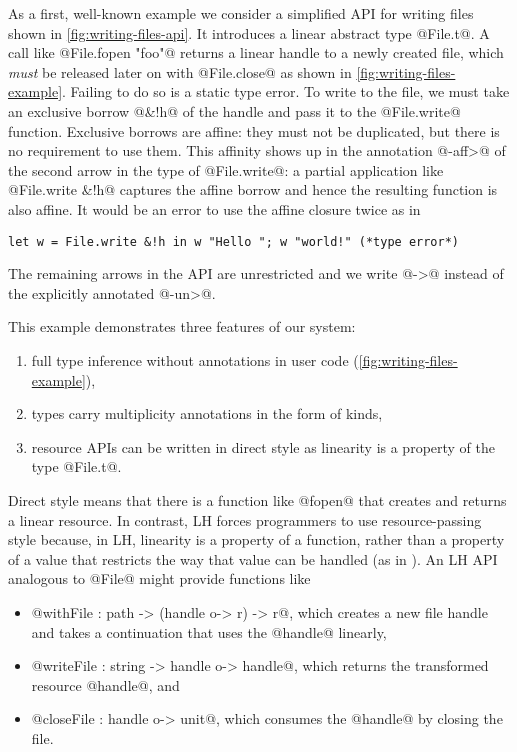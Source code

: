 As a first, well-known example we consider a simplified API for
writing files shown in \cref{fig:writing-files-api}.  It introduces a
linear abstract type @File.t@. A call like
@File.fopen "foo"@ returns a linear handle to a newly created
file, which \emph{must} be released later on with @File.close@
as shown in \cref{fig:writing-files-example}. Failing to do so is a
static type error.  To write to the file, we must take an exclusive
borrow @&!h@ of the handle and pass it to the
@File.write@ function. Exclusive borrows are affine:
they must not be duplicated, but there is no requirement to use
them. This affinity shows up in the annotation @-{aff}>@ of the second arrow in
the type of @File.write@: a partial application like
@File.write &!h@ captures the affine borrow and hence the
resulting function is also affine. It
would be an error to use the affine closure twice as in
\begin{lstlisting}
let w = File.write &!h in w "Hello "; w "world!" (*type error*)
\end{lstlisting}
The remaining arrows in
the API are unrestricted and we write @->@ instead of the
explicitly annotated @-{un}>@.


This example demonstrates three features of our system:
\begin{enumerate}
\item full type inference without annotations in user code (\cref{fig:writing-files-example}),
\item types carry multiplicity annotations in the form of kinds,
\item resource APIs can be written in direct style as linearity is a
  property of the type @File.t@.
\end{enumerate}

Direct style means that there is a function like @fopen@ that creates
and returns a linear resource. In contrast, LH forces programmers to
use resource-passing style because, in LH, linearity is a property of
a function, rather than a property of a value that restricts the way
that value can be handled (as in \lang). An LH API analogous to @File@
might provide functions like
\begin{itemize}
\item @withFile : path -> (handle o-> r) -> r@, which creates a new
  file handle and takes a continuation that uses the @handle@ linearly,
\item @writeFile : string -> handle o-> handle@, which
  returns the transformed resource @handle@, and
\item @closeFile : handle o-> unit@, which consumes the @handle@ by
  closing the file.
\end{itemize}

